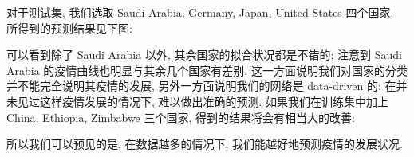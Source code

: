 \documentclass[UTF8]{ctexart}
\begin{document}
	对于测试集, 我们选取 Saudi Arabia, Germany, Japan, United States 四个国家. 所得到的预测结果见下图:
	\begin{figure}[htbp]
	    \centering
	\end{figure}
	可以看到除了 Saudi Arabia 以外, 其余国家的拟合状况都是不错的; 注意到 Saudi Arabia 的疫情曲线也明显与其余几个国家有差别. 这一方面说明我们对国家的分类并不能完全说明其疫情的发展, 另外一方面说明我们的网络是 data-driven 的: 在并未见过这样疫情发展的情况下, 难以做出准确的预测. 如果我们在训练集中加上 China, Ethiopia, Zimbabwe 三个国家, 得到的结果将会有相当大的改善:
	\begin{figure}[htbp]
	    \centering
	\end{figure}
	所以我们可以预见的是, 在数据越多的情况下, 我们能越好地预测疫情的发展状况.
\end{document}
